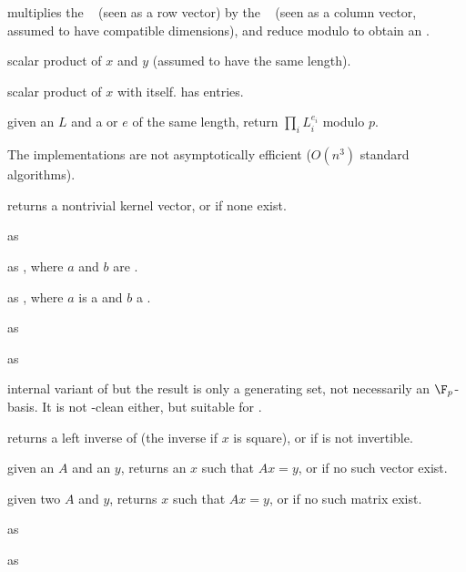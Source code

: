  multiplies the ~
(seen as a row vector) by the ~ (seen as a column vector,
assumed to have compatible dimensions), and reduce modulo  to obtain
an .

 scalar product of
$x$ and $y$ (assumed to have the same length).

 scalar product of $x$ with itself.
has  entries.

 given an  $L$
and a  or  $e$ of the same length, return $\prod_i L_i^{e_i}$
modulo $p$.

 The implementations are not
asymptotically efficient ($O(n^3)$ standard algorithms).

 returns a nontrivial kernel vector,
or  if none exist.

 as 

 as , where $a$ and
$b$ are .

 as , where $a$
is a  and $b$ a .

 as 

 as 

 internal variant of
 but the result is only a generating set, not
necessarily an $\F_p$-basis. It is not -clean either, but
suitable for .

 returns a left inverse of 
(the inverse if $x$ is square), or  if  is not invertible.

 given an  $A$ and an  $y$, returns an $x$ such that $Ax =
 y$, or  if no such vector exist.

given two  $A$ and $y$, returns $x$ such that $Ax = y$, or 
if no such matrix exist.

 as 

 as 

